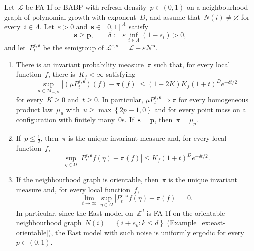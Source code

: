 \documentclass[EJP,preprint,NODS,nobera]{ejpecp}
\newcommand{\Z}{\mathbb{Z}}
\newcommand{\bb}[1]{\left(#1\right)}
\newcommand{\cb}[1]{\left\{#1\right\}}
\newcommand{\abs}[1]{\left|#1\right|}
\newcommand{\vn}{\varnothing}
\newcommand{\mb}[1]{\mathbf{#1}}
\newcommand{\Lcal}{\mathcal{L}}
\newcommand{\Ncal}{\mathcal{N}}
\begin{document}
\begin{corollary}
\label{cor:perturbed-fa-babp-ergodicity}
\label{prop:perturbed-fa-babp-convergence}
Let~$\Lcal$ be FA-1f or BABP with refresh density~$p\in(0,1)$ on a
neighbourhood graph of polynomial growth with exponent~$D$, and assume
that~$N(i)\neq\vn$ for every~$i\in\Lambda$. Let~$\varepsilon>0$
and~$\mb s\in[0,1]^\Lambda$ satisfy
\begin{equation*}
\mb s\geq\mb p,
\qquad
\delta
:=
\varepsilon\inf_{i\in\Lambda}\bb{1-s_i}
>0,
\end{equation*}
and let~$P_t^{\varepsilon,\mb s}$ be the semigroup of
$\Lcal^{\varepsilon,\mb s}=\Lcal+\varepsilon\Ncal^{\mb s}$.
\begin{enumerate}[label=\textup{(\roman*)}]
\item There is an invariant probability measure~$\pi$ such that, for every
local function~$f$, there is~$K_f<\infty$ satisfying
\begin{equation}
\label{eq:perturbed-fa-babp-convergence}
\sup_{\mu\in\mathcal M_{-,K}}
\abs{(\mu P_t^{\varepsilon,\mb s})(f)-\pi(f)}
\leq
(1+2K)K_f(1+t)^D e^{-\delta t/2}
\end{equation}
for every~$K\geq0$ and~$t\geq0$. In particular,
$\mu P_t^{\varepsilon,\mb s}\Rightarrow\pi$ for every homogeneous product
law~$\mu_u$ with~$u\geq\max\cb{2p-1,0}$ and for every point mass on a
configuration with finitely many~$0$s. If~$\mb s=\mb p$, then~$\pi=\mu_p$.

\item If~$p\leq\frac12$, then~$\pi$ is the unique invariant measure and,
for every local function~$f$,
\begin{equation*}
\sup_{\eta\in\Omega}
\abs{P_t^{\varepsilon,\mb s}f(\eta)-\pi(f)}
\leq
K_f(1+t)^D e^{-\delta t/2}.
\end{equation*}

\item If the neighbourhood graph is orientable, then~$\pi$ is the unique
invariant measure and, for every local function~$f$,
\begin{equation*}
\lim_{t\to\infty}
\sup_{\eta\in\Omega}
\abs{P_t^{\varepsilon,\mb s}f(\eta)-\pi(f)}
=
0.
\end{equation*}
In particular, since the East model on~$\Z^d$ is FA-1f on the orientable
neighbourhood graph~$N(i)=\cb{i+e_k:k\leq d}$
(Example~\ref{ex:east-orientable}), the East model with such noise is
uniformly ergodic for every~$p\in(0,1)$.
\end{enumerate}
\end{corollary}
\end{document}

